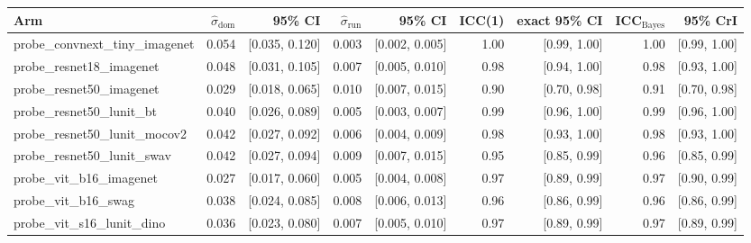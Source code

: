 \begin{tabular}{lrrrrrrrr}
\toprule
Arm & $\hat\sigma_\text{dom}$ & 95\% CI & $\hat\sigma_\text{run}$ & 95\% CI & ICC(1) & exact 95\% CI & ICC$_\text{Bayes}$ & 95\% CrI \\
\midrule
probe\_convnext\_tiny\_imagenet & 0.054 & [0.035, 0.120] & 0.003 & [0.002, 0.005] & 1.00 & [0.99, 1.00] & 1.00 & [0.99, 1.00] \\
probe\_resnet18\_imagenet & 0.048 & [0.031, 0.105] & 0.007 & [0.005, 0.010] & 0.98 & [0.94, 1.00] & 0.98 & [0.93, 1.00] \\
probe\_resnet50\_imagenet & 0.029 & [0.018, 0.065] & 0.010 & [0.007, 0.015] & 0.90 & [0.70, 0.98] & 0.91 & [0.70, 0.98] \\
probe\_resnet50\_lunit\_bt & 0.040 & [0.026, 0.089] & 0.005 & [0.003, 0.007] & 0.99 & [0.96, 1.00] & 0.99 & [0.96, 1.00] \\
probe\_resnet50\_lunit\_mocov2 & 0.042 & [0.027, 0.092] & 0.006 & [0.004, 0.009] & 0.98 & [0.93, 1.00] & 0.98 & [0.93, 1.00] \\
probe\_resnet50\_lunit\_swav & 0.042 & [0.027, 0.094] & 0.009 & [0.007, 0.015] & 0.95 & [0.85, 0.99] & 0.96 & [0.85, 0.99] \\
probe\_vit\_b16\_imagenet & 0.027 & [0.017, 0.060] & 0.005 & [0.004, 0.008] & 0.97 & [0.89, 0.99] & 0.97 & [0.90, 0.99] \\
probe\_vit\_b16\_swag & 0.038 & [0.024, 0.085] & 0.008 & [0.006, 0.013] & 0.96 & [0.86, 0.99] & 0.96 & [0.86, 0.99] \\
probe\_vit\_s16\_lunit\_dino & 0.036 & [0.023, 0.080] & 0.007 & [0.005, 0.010] & 0.97 & [0.89, 0.99] & 0.97 & [0.89, 0.99] \\
\bottomrule
\end{tabular}
